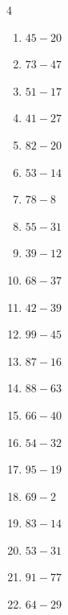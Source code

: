 \begin{multicols}{4}
\begin{enumerate}
  \item $45-20$
        \phantom{$=25$}

  \item $73-47$
        \phantom{$=26$}

  \item $51-17$
        \phantom{$=34$}

  \item $41-27$
        \phantom{$=14$}

  \item $82-20$
        \phantom{$=62$}

  \item $53-14$
        \phantom{$=39$}

  \item $78-8$
        \phantom{$=70$}

  \item $55-31$
        \phantom{$=24$}

\columnbreak %

  \item $39-12$
        \phantom{$=27$}

  \item $68-37$
        \phantom{$=31$}

  \item $42-39$
        \phantom{$=3$}

  \item $99-45$
        \phantom{$=54$}

  \item $87-16$
        \phantom{$=71$}

  \item $88-63$
        \phantom{$=25$}

  \item $66-40$
        \phantom{$=26$}

  \item $54-32$
        \phantom{$=22$}

  \item $95-19$
        \phantom{$=76$}

  \item $69-2$
        \phantom{$=67$}

  \item $83-14$
        \phantom{$=69$}

  \item $53-31$
        \phantom{$=22$}

  \item $91-77$
        \phantom{$=14$}

  \item $64-29$
        \phantom{$=35$}


\end{enumerate}
\end{multicols}
